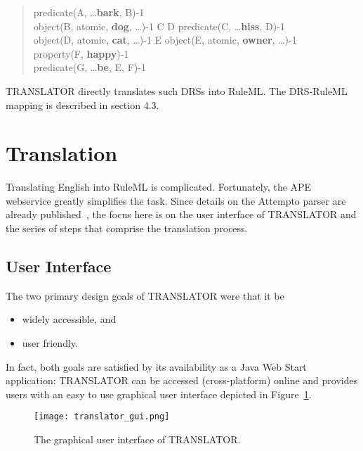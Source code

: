 \documentclass[12pt]{article}
\begin{document}
\begin{quote}
\drs{~}
{
 \downifdrs{~}
 {
  {
   predicate(A, \ldots \textbf{bark}, B)-1\\
   object(B, atomic, \textbf{dog}, \ldots )-1
  }
  {C D}
  {
   predicate(C, \ldots \textbf{hiss}, D)-1\\
   object(D, atomic, \textbf{cat}, \ldots )-1
  }
 }
 {E}
 {
  object(E, atomic, \textbf{owner}, \ldots )-1\\
  {
   property(F, \textbf{happy})-1\\
   predicate(G, \ldots \textbf{be}, E, F)-1
  }
 }
}
\end{quote}

TRANSLATOR directly translates such DRSs into RuleML. The DRS-RuleML mapping is described in section 4.3.

\section{Translation}
Translating English into RuleML is complicated. Fortunately, the APE webservice greatly simplifies the task. Since details on the Attempto parser are already published~\cite{ape}, the focus here is on the user interface of TRANSLATOR and the series of steps that comprise the translation process.

\subsection{User Interface}

The two primary design goals of TRANSLATOR were that it be
\begin{itemize}
	\item widely accessible, and
	\item user friendly.
\end{itemize}
In fact, both goals are satisfied by its availability as a Java Web Start application: TRANSLATOR can be accessed (cross-platform) online and provides users with an easy to use graphical user interface depicted in Figure~\ref*{fig:gui}.

\begin{figure}[htbp]
	\begin{center}
	  \texttt{[image: translator\_gui.png]}
	\caption{The graphical user interface of TRANSLATOR.}
	\label{fig:gui}
	\end{center}
\end{figure}
\end{document}

